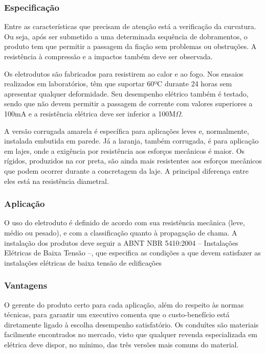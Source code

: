 \subsubsection{Especificação}

Entre as características que precisam de atenção está a verificação da curvatura. Ou seja, após ser submetido a uma determinada sequência de dobramentos, o produto tem que permitir a passagem da fiação sem problemas ou obstruções. A resistência à compressão e a impactos também deve ser observada.

Os eletrodutos são fabricados para resistirem ao calor e ao fogo. Nos ensaios realizados em laboratórios, têm que suportar 60ºC durante 24 horas sem apresentar qualquer deformidade. Seu desempenho elétrico também é testado, sendo que não devem permitir a passagem de corrente com valores superiores a 100mA e a resistência elétrica deve ser inferior a 100M$\Omega$.

A versão corrugada amarela é específica para aplicações leves e, normalmente, instalada embutida em parede. Já a laranja, também corrugada, é para aplicação em lajes, onde a exigência por resistência aos esforços mecânicos é maior. Os rígidos, produzidos na cor preta, são ainda mais resistentes aos esforços mecânicos que podem ocorrer durante a concretagem da laje. A principal diferença entre eles está na resistência diametral.

\subsubsection{Aplicação}

O uso do eletroduto é definido de acordo com sua resistência mecânica (leve, médio ou pesado), e com a classificação quanto à propagação de chama. A instalação dos produtos deve seguir a ABNT NBR 5410:2004 – Instalações Elétricas de Baixa Tensão –, que especifica as condições a que devem satisfazer as instalações elétricas de baixa tensão de edificações

\subsubsection{Vantagens}

O gerente do produto certo para cada aplicação, além do respeito às normas técnicas, para garantir um executivo comenta que o custo-benefício está diretamente ligado à escolha desempenho satisfatório.  Os conduítes são materiais facilmente encontrados no mercado, visto que qualquer revenda especializada em elétrica deve dispor, no mínimo, das três versões mais comuns do material.

